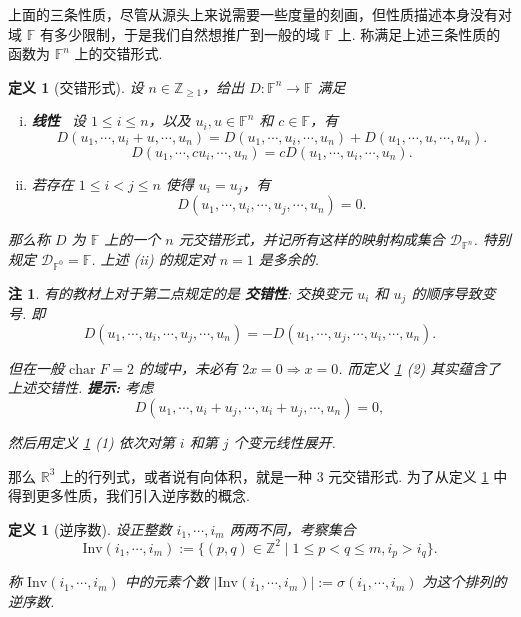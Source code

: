 \documentclass[10pt,openany]{article}
\theoremstyle{thmstyle} %
\theoremstyle{defstyle} %
\newtheorem{definition}[theorem]{定义}
\theoremstyle{prostyle} %
\theoremstyle{exastyle}
\theoremstyle{remstyle}
\newtheorem{remark}[theorem]{注}
\newcommand{\F}{\mathbb{F}}
\newcommand{\R}{\mathbb{R}}
\newcommand{\tz}{\mathrm{char} \;}
\begin{document}
上面的三条性质，尽管从源头上来说需要一些度量的刻画，但性质描述本身没有对域 \( \F \) 有多少限制，于是我们自然想推广到一般的域 \( \F \) 上. 称满足上述三条性质的函数为 \( \F^n \) 上的交错形式.
 
\begin{definition}[交错形式] \label{2.3.23}
	设 \( n \in \mathbb{Z}_{\geq 1}\)，给出 \( D: \F^n \to \F \) 满足
	\begin{enumerate}[(i)]
		\item \textbf{线性} \ 设 \( 1 \leq i \leq n \)，以及 \( u_i,u \in \F^n \) 和 \( c \in \F \)，有
		\[ D(u_1,\cdots,u_i+u,\cdots,u_n)=D(u_1,\cdots,u_i,\cdots,u_n)+D(u_1,\cdots,u,\cdots,u_n). \]
		\[ D(u_1,\cdots,cu_i,\cdots,u_n)=cD(u_1,\cdots,u_i,\cdots,u_n). \]
		
		\item 若存在 \( 1 \leq i<j \leq n \) 使得 \( u_i=u_j \)，有
		\[ D(u_1,\cdots,u_i,\cdots,u_j,\cdots,u_n)=0. \]
	\end{enumerate}
	
    那么称 \( D \) 为 \( \F \) 上的一个 \( n \) 元交错形式，并记所有这样的映射构成集合 \( \mathcal{D}_{\F^n} \). 特别规定 \( \mathcal{D}_{\F^0}=\F \). 上述 (ii) 的规定对 \( n=1 \) 是多余的.
\end{definition}

\begin{remark} \label{2.3.24}
	有的教材上对于第二点规定的是 \textbf{交错性}: 交换变元 \(u_i \) 和 \( u_j \) 的顺序导致变号. 即
	\[  D(u_1,\cdots,u_i,\cdots,u_j,\cdots,u_n)=- D(u_1,\cdots,u_j,\cdots,u_i,\cdots,u_n). \]
	
	但在一般 \( \tz F=2 \) 的域中，未必有 \( 2x=0 \Rightarrow x=0 \). 而定义 \ref{2.3.23} (2) 其实蕴含了上述交错性. \textbf{提示: }考虑
	\[ D(u_1,\cdots,u_i+u_j,\cdots,u_i+u_j,\cdots,u_n)=0, \]
	
	然后用定义 \ref{2.3.23} (1) 依次对第 \( i \) 和第 \( j \) 个变元线性展开.
\end{remark}

那么 \( \R^3 \) 上的行列式，或者说有向体积，就是一种 \( 3 \) 元交错形式. 为了从定义 \ref{2.3.23} 中得到更多性质，我们引入逆序数的概念.

\begin{definition}[逆序数] \label{2.3.25}
	设正整数 \( i_1,\cdots,i_m \) 两两不同，考察集合
	\[ \text{Inv}(i_1,\cdots,i_m):=\{(p,q) \in \mathbb{Z}^2 \mid 1 \leq p<q \leq m, i_p>i_q \}. \]
	
	称 \( \text{Inv}(i_1,\cdots,i_m) \) 中的元素个数 \( |\text{Inv}(i_1,\cdots,i_m)|:= \sigma(i_1,\cdots,i_m) \) 为这个排列的逆序数.
\end{definition}
\end{document}
